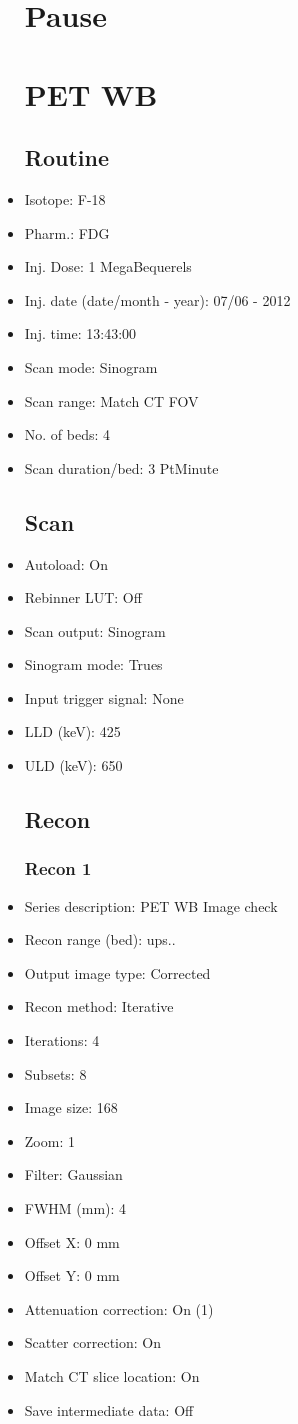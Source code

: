 \documentclass[12pt]{article}
\begin{document}
\begin{itemize}
\section{Pause}

\section{PET WB}
\subsection{Routine}
\item Isotope: F-18
\item Pharm.: FDG
\item Inj. Dose: 1 MegaBequerels
\item Inj. date (date/month - year): 07/06 - 2012
\item Inj. time: 13:43:00
\item Scan mode: Sinogram
\item Scan range: Match CT FOV
\item No. of beds: 4
\item Scan duration/bed: 3 PtMinute
\subsection{Scan}
\item Autoload: On
\item Rebinner LUT: Off
\item Scan output: Sinogram
\item Sinogram mode: Trues
\item Input trigger signal: None
\item LLD (keV): 425
\item ULD (keV): 650
\subsection{Recon}

\subsubsection{Recon 1}
\item Series description: PET WB Image check
\item Recon range (bed): ups..
\item Output image type: Corrected
\item Recon method: Iterative
\item Iterations: 4
\item Subsets: 8
\item Image size: 168
\item Zoom: 1
\item Filter: Gaussian
\item FWHM (mm): 4
\item Offset X: 0 mm
\item Offset Y: 0 mm
\item Attenuation correction: On (1)
\item Scatter correction: On
\item Match CT slice location: On
\item Save intermediate data: Off

\end{itemize}
\end{document}
